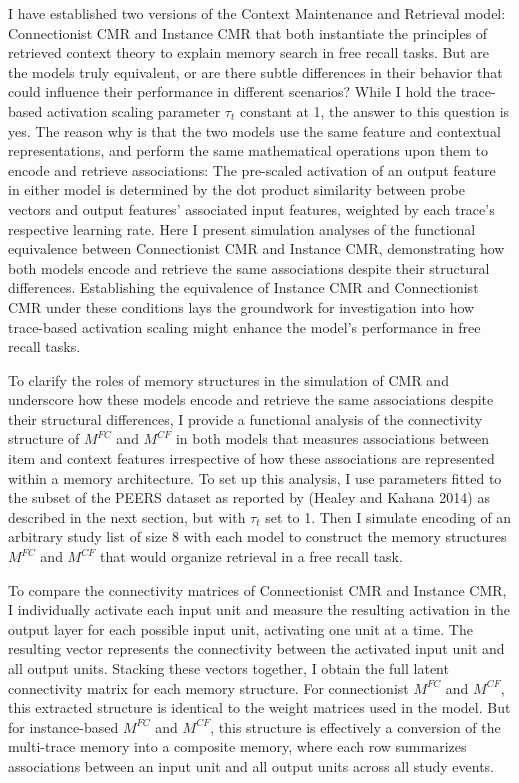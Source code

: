 \documentclass[
  letterpaper,
  11pt,
  english,
  singlespacing,
  headsepline]{MastersDoctoralThesis}
\begin{document}
I have established two versions of the Context Maintenance and Retrieval
model: Connectionist CMR and Instance CMR that both instantiate the
principles of retrieved context theory to explain memory search in free
recall tasks. But are the models truly equivalent, or are there subtle
differences in their behavior that could influence their performance in
different scenarios? While I hold the trace-based activation scaling
parameter \(\tau_{t}\) constant at 1, the answer to this question is
yes. The reason why is that the two models use the same feature and
contextual representations, and perform the same mathematical operations
upon them to encode and retrieve associations: The pre-scaled activation
of an output feature in either model is determined by the dot product
similarity between probe vectors and output features' associated input
features, weighted by each trace's respective learning rate. Here I
present simulation analyses of the functional equivalence between
Connectionist CMR and Instance CMR, demonstrating how both models encode
and retrieve the same associations despite their structural differences.
Establishing the equivalence of Instance CMR and Connectionist CMR under
these conditions lays the groundwork for investigation into how
trace-based activation scaling might enhance the model's performance in
free recall tasks.

To clarify the roles of memory structures in the simulation of CMR and
underscore how these models encode and retrieve the same associations
despite their structural differences, I provide a functional analysis of
the connectivity structure of \(M^{FC}\) and \(M^{CF}\) in both models
that measures associations between item and context features
irrespective of how these associations are represented within a memory
architecture. To set up this analysis, I use parameters fitted to the
subset of the PEERS dataset as reported by (Healey and Kahana 2014) as
described in the next section, but with \(\tau_{t}\) set to 1. Then I
simulate encoding of an arbitrary study list of size 8 with each model
to construct the memory structures \(M^{FC}\) and \(M^{CF}\) that would
organize retrieval in a free recall task.

To compare the connectivity matrices of Connectionist CMR and Instance
CMR, I individually activate each input unit and measure the resulting
activation in the output layer for each possible input unit, activating
one unit at a time. The resulting vector represents the connectivity
between the activated input unit and all output units. Stacking these
vectors together, I obtain the full latent connectivity matrix for each
memory structure. For connectionist \(M^{FC}\) and \(M^{CF}\), this
extracted structure is identical to the weight matrices used in the
model. But for instance-based \(M^{FC}\) and \(M^{CF}\), this structure
is effectively a conversion of the multi-trace memory into a composite
memory, where each row summarizes associations between an input unit and
all output units across all study events.
\end{document}
